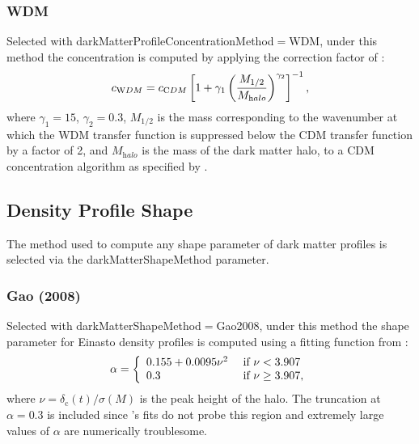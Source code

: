\subsubsection{WDM}

Selected with {\normalfont \ttfamily darkMatterProfileConcentrationMethod}$=${\normalfont \ttfamily WDM}, under this method the concentration is computed by applying the correction factor of \cite{schneider_non-linear_2012}:
\begin{equation}
c_{\mathrm WDM} = c_{\mathrm CDM} \left[ 1 + \gamma_1 \left( {M_{\mathrm 1/2} \over M_{\mathrm halo}} \right)^{\gamma_2}\right]^{-1},
\end{equation}
where $\gamma_1=15$, $\gamma_2=0.3$, $M_{\mathrm 1/2}$ is the mass corresponding to the wavenumber at which the WDM transfer function is suppressed below the CDM transfer function by a factor of 2, and $M_{\mathrm halo}$ is the mass of the dark matter halo, to a CDM concentration algorithm as specified by {\normalfont \ttfamily [darkMatterProfileConcentrationCDMMethod]}.

\subsection{Density Profile Shape}\label{sec:DarkMatterProfileShape}

The method used to compute any shape parameter of dark matter profiles is selected via the {\normalfont \ttfamily darkMatterShapeMethod} parameter.

\subsubsection{Gao (2008)}

Selected with {\normalfont \ttfamily darkMatterShapeMethod}$=${\normalfont \ttfamily Gao2008}, under this method the shape parameter for Einasto density profiles is computed using a fitting function from \cite{gao_redshift_2008}:
\begin{equation}
\alpha = \left\{ \begin{array}{ll} 0.155 + 0.0095\nu^2 & \hbox{ if } \nu < 3.907 \\ 0.3 & \hbox{ if } \nu \ge 3.907, \end{array} \right.
\end{equation}
where $\nu=\delta_{\mathrm c}(t)/\sigma(M)$ is the peak height of the halo. The truncation at $\alpha = 0.3$ is included since \cite{gao_redshift_2008}'s fits do not probe this region and extremely large values of $\alpha$ are numerically troublesome.

